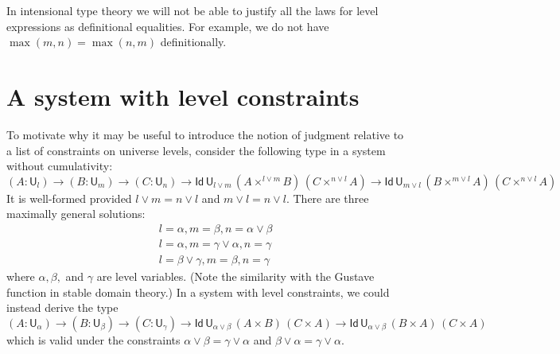 \documentclass[11pt,a4paper]{article}
\newcommand{\Id}{\mathsf{Id}}
\def\UU{\mathsf{U}}
\begin{document}
In intensional type theory we will not be able to justify all the laws for level expressions as definitional equalities. For example, we do not have $\max(m,n)=\max(n,m)$ definitionally.

\section{A system with level constraints}\label{sec:constraints}

To motivate why it may be useful to introduce the notion of judgment relative to a list of constraints on universe levels, consider the following type in a system without cumulativity:
%
$$
    (A : \UU_l) \to (B : \UU_m) \to (C : \UU_n) 
    \to \Id\,\UU_{l \vee m}\, (A\times^{l \vee m} B)\,(C \times^{n \vee l} A)
    \to \Id\,\UU_{m \vee l} \, (B\times^{m \vee l} A)\,(C \times^{n \vee l} A)
$$
It is well-formed provided $l \vee m = n \vee l$ and $m \vee l = n \vee l$. There are three maximally general solutions: 
\begin{eqnarray*}
&&l = \alpha, m = \beta, n = \alpha \vee \beta\\
&&l = \alpha, m = \gamma \vee \alpha, n = \gamma\\
&&l = \beta \vee \gamma, m = \beta, n = \gamma
\end{eqnarray*}
where $\alpha, \beta,$ and $\gamma$ are level variables.
%
(Note the similarity with the Gustave function in stable domain theory.)
In a system with level constraints, we could instead derive the type
$$
    (A : \UU_\alpha) \to (B : \UU_\beta) \to (C : \UU_\gamma) 
    \to \Id\,\UU_{\alpha \vee \beta}\, (A\times B)\,(C \times A)
    \to \Id\,\UU_{\alpha \vee \beta}\, (B\times A)\,(C \times A)
$$
which is valid under the constraints
$
\alpha \vee \beta = \gamma \vee \alpha
$
and 
$
\beta \vee \alpha = \gamma \vee \alpha.
$
\end{document}
